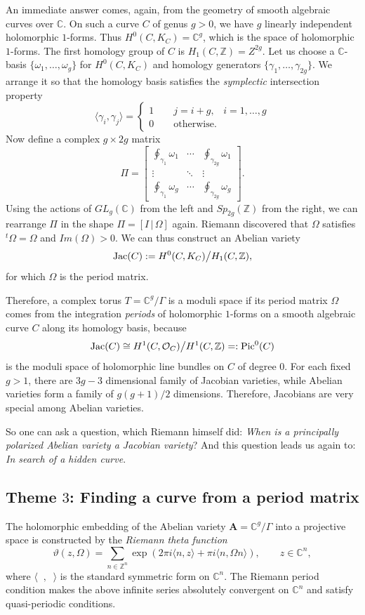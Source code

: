 \documentclass{amsart}
\theoremstyle{definition}
\numberwithin{equation}{section}
\numberwithin{figure}{section}
\def\isom{\cong}
\def\gam{\gamma}
\def\Gam{\Gamma}
\def\Jac{{\text{\rm{Jac}}}}
\def\Pic{{\text{\rm{Pic}}}}
\def\Jac{{\text{\rm{Jac}}}}
\newcommand{\be}{\begin{equation}}
\newcommand{\ee}{\end{equation}}
\newcommand{\bC}{{\mathbb{C}}}
\newcommand{\bZ}{{\mathbb{Z}}}
\newcommand{\cO}{{\mathcal{O}}}
\newcommand{\la}{{\langle}}
\newcommand{\ra}{{\rangle}}
\begin{document}
An immediate answer comes, again, 
from the geometry of smooth algebraic curves
over $\bC$. On such a curve $C$ of genus $g>0$, we have $g$ linearly
independent holomorphic $1$-forms. Thus
$H^0(C,K_C) = \bC ^g$, which is the  space of holomorphic $1$-forms. The first 
homology group of $C$ is $H_1(C,\bZ) = Z^{2g}$. Let us choose a $\bC$-basis
$\{\omega_1,\dots,\omega_g\}$ for $H^0(C,K_C)$ and homology 
generators $\{\gam_1,\dots,\gam_{2g}\}$. We arrange it so that the
homology basis satisfies the \emph{symplectic} intersection property
\be
\label{homology}
\la \gam_i, \gam_j\ra = \begin{cases}
1\qquad j=i+g,\;\;\; i=1, \dots, g\\
0 \qquad \text{otherwise}.
\end{cases}
\ee
Now define a complex $g\times 2g$ matrix 
$$
\Pi = \begin{bmatrix}
\oint_{\gam_1}\omega_1 &\cdots& \oint_{\gam_{2g}}\omega_1\\
\vdots &\ddots&\vdots\\ 
\oint_{\gam_1}\omega_g &\cdots& \oint_{\gam_{2g}}\omega_g
\end{bmatrix}.
$$
Using the actions of $GL_g(\bC)$ from the left and $Sp_{2g}(\bZ)$
from the right, we can rearrange $\Pi$ in the shape $\Pi = [I\,|\,\Omega]$
again. Riemann discovered that $\Omega$ satisfies 
$^t \Omega = \Omega$ and 
$Im(\Omega)>0$. We can thus construct an Abelian variety
$$
\Jac(C) := H^0(C, K_C)\big/H_1(C,\bZ),
$$
for which $\Omega$ is the period matrix.


Therefore, a complex torus $T=\bC^g/\Gam$ is a moduli space
if its period matrix $\Omega$ comes from the integration \emph{periods}
of holomorphic $1$-forms on a smooth algebraic curve $C$
along its homology basis, because
$$
\Jac(C) \isom H^1(C,\cO_C)\big/H^1(C,\bZ) =: \Pic^0(C)
$$ 
is the moduli space
of holomorphic line bundles on $C$ of degree $0$.
For each fixed $g>1$, there are $3g-3$ dimensional family of Jacobian 
varieties, while Abelian varieties form a family of $g(g+1)/2$ dimensions.
Therefore, Jacobians are very special among Abelian varieties.

So one can ask a question, which Riemann himself did: \emph{When is 
a principally polarized Abelian variety a Jacobian variety}? 
And this question leads us  again to:  \emph{In search of a hidden curve}.


\subsection{Theme $3$: Finding a curve from a period matrix}
The holomorphic embedding of the Abelian variety $\mathbf{A} = \bC^g/\Gam$
into a projective space is constructed by the \emph{Riemann theta function}
\be
\label{theta}
\vartheta(z,\Omega) = \sum_{n\in \bZ^n} \exp
\left(2\pi i \la n,z\ra + \pi i \la n,\Omega n\ra\right), \qquad z\in \bC^n,
\ee
where $\la\;\;,\;\;\ra$ is the standard symmetric form on $\bC^n$.
The Riemann period condition makes
the above infinite series absolutely convergent on $\bC^n$ and satisfy
quasi-periodic conditions. 
\end{document}
